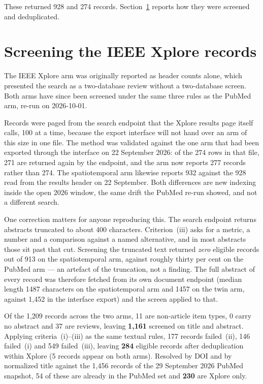\documentclass[journal]{IEEEtran}
\begin{document}
\noindent These returned 928 and 274 records. Section~\ref{sec:ieeescreen} reports how they were screened and deduplicated.

\section{Screening the IEEE Xplore records}
\label{sec:ieeescreen}
The IEEE Xplore arm was originally reported as header counts alone, which
presented the search as a two-database review without a two-database screen.
Both arms have since been screened under the same three rules as the PubMed arm,
re-run on 2026-10-01.

Records were paged from the search endpoint that the Xplore results page itself
calls, 100 at a time, because the export interface will not hand over an arm of
this size in one file. The method was validated against the one arm that had been
exported through the interface on 22 September 2026: of the 274 rows in that file,
271 are returned again by the endpoint, and the arm now reports
277 records rather than 274. The spatiotemporal arm likewise reports
932 against the 928 read from the results header on 22 September.
Both differences are new indexing inside the open 2026 window, the same drift the
PubMed re-run showed, and not a different search.

One correction matters for anyone reproducing this. The search endpoint returns
abstracts truncated to about 400 characters. Criterion~(iii) asks for a metric, a
number and a comparison against a named alternative, and in most abstracts those
sit past that cut. Screening the truncated text returned \emph{zero} eligible
records out of 913 on the spatiotemporal arm, against
roughly thirty per cent on the PubMed arm --- an artefact of the truncation, not a
finding. The full abstract of every record was therefore fetched from its own
document endpoint (median length 1487 characters on the
spatiotemporal arm and 1457 on the twin arm, against 1{,}452 in the
interface export) and the screen applied to that.

Of the 1{,}209 records across the two arms, 11 are non-article item types,
0 carry no abstract and 37 are reviews, leaving \textbf{1{,}161}
screened on title and abstract. Applying criteria~(i)--(iii) as the same textual
rules, 177 records failed~(ii), 146 failed~(i) and 549 failed~(iii),
leaving \textbf{284} eligible records after deduplication within Xplore
(5 records appear on both arms). Resolved by DOI and
by normalized title against the 1{,}456 records of the
29 September 2026 PubMed snapshot, 54 of these are already
in the PubMed set and \textbf{230} are Xplore only.
\end{document}
